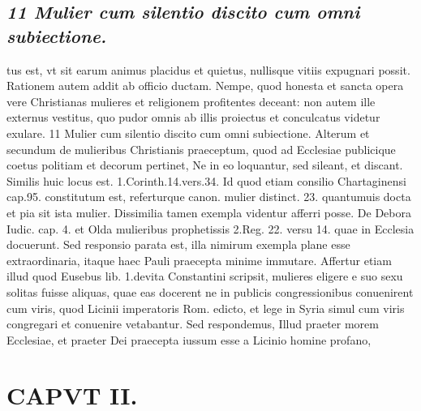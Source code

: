 \documentclass{article}
\begin{document}
\begin{pages}
\subsection*{\textit{11 Mulier cum silentio discito cum omni subiectione.}}tus est, vt sit earum animus placidus et quietus, nullisque vitiis expugnari possit. Rationem autem addit ab officio ductam. Nempe, quod honesta et sancta opera vere Christianas mulieres et religionem profitentes deceant: non autem ille externus vestitus, quo pudor omnis ab illis proiectus et conculcatus videtur exulare. 11 Mulier cum silentio discito cum omni subiectione. Alterum et secundum de mulieribus Christianis praeceptum, quod ad Ecclesiae publicique coetus politiam et decorum pertinet, Ne in eo loquantur, sed sileant, et discant. Similis huic locus est. 1.Corinth.14.vers.34. Id quod etiam consilio Chartaginensi cap.95. constitutum est, referturque canon. mulier distinct. 23. quantumuis docta et pia sit ista mulier. Dissimilia tamen exempla videntur afferri posse. De Debora Iudic. cap. 4. et Olda mulieribus prophetissis 2.Reg. 22. versu 14. quae in Ecclesia docuerunt. Sed responsio parata est, illa nimirum exempla plane esse extraordinaria, itaque haec Pauli praecepta minime immutare. Affertur etiam illud quod Eusebus lib.  1.devita Constantini scripsit, mulieres eligere e suo sexu solitas fuisse aliquas, quae eas docerent ne in publicis congressionibus conuenirent cum viris, quod Licinii imperatoris Rom. edicto, et lege in Syria simul cum viris congregari et conuenire vetabantur. Sed respondemus, Illud praeter morem Ecclesiae, et praeter Dei praecepta iussum esse a Licinio homine profano,  \pend
\section*{CAPVT  II. }
\marginpar{[ p.83 ]}\pstart {}
{}

\end{pages}
\end{document}
